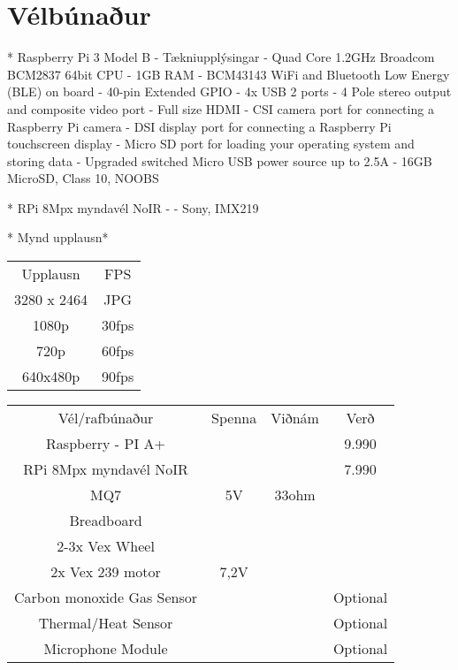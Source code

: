\section{Vélbúnaður}
* Raspberry Pi 3 Model B - Tækniupplýsingar 
	- Quad Core 1.2GHz Broadcom BCM2837 64bit CPU
	- 1GB RAM
	- BCM43143 WiFi and Bluetooth Low Energy (BLE) on board
	- 40-pin Extended GPIO
	- 4x USB 2 ports
	- 4 Pole stereo output and composite video port
	- Full size HDMI
 	- CSI camera port for connecting a Raspberry Pi camera
	- DSI display port for connecting a Raspberry Pi touchscreen display
	- Micro SD port for loading your operating system and storing data
	- Upgraded switched Micro USB power source up to 2.5A
	- 16GB MicroSD, Class 10, NOOBS

* RPi 8Mpx myndavél NoIR -
	- Sony, IMX219

	* Mynd upplausn*
\begin{center}
\begin{tabular}{ |c|c| } 
 \hline
 Upplausn & FPS\\ 
 3280 x 2464 & JPG\\
1080p & 30fps\\
720p & 60fps\\ 
640x480p & 90fps\\
 \hline
\end{tabular}
\end{center}

\begin{center}
\begin{tabular}{ |c|c|c|c| } 
 \hline
 Vél/rafbúnaður & Spenna & Viðnám & Verð\\ 
 Raspberry - PI A+  & & & 9.990 \\ 
 RPi 8Mpx myndavél NoIR & & & 7.990\\
 MQ7 & 5V & 33ohm &\\ 
 Breadboard & & & \\
 2-3x Vex Wheel & & & \\
 2x Vex 239 motor & 7,2V & &\\
 Carbon monoxide Gas Sensor   & & & Optional\\
 Thermal/Heat Sensor & & & Optional\\
 Microphone Module & & &  Optional\\

 \hline
\end{tabular}
\end{center}